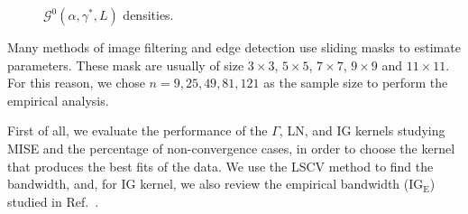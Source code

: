 \documentclass[twocolumn]{svjour3}
\begin{document}
	\begin{figure}[hbt]
		\centering
		\caption{$\mathcal{G}^0(\alpha,\gamma^*,L)$ densities.}\label{densidades} 
	\end{figure}
	
	Many methods of image filtering and edge detection use sliding masks to estimate parameters. 
	These mask are usually of size $3 \times 3$, $5 \times 5$, $7 \times 7$, $9 \times 9$ and $11 \times 11$. 
	For this reason, we chose $n=9,25,49,81,121$ as the sample size to perform the empirical analysis.
	
	First of all, we evaluate the performance of the $\Gamma$, LN, and IG kernels studying MISE and the percentage of non-convergence cases, in order to choose the kernel that produces the best fits of the data. 
	We use the LSCV method to find the bandwidth, and, for IG kernel, we also review the empirical bandwidth ($\text{IG}_{\text{E}}$) studied in Ref.~\cite{gambini2015}. 
	
\end{document}
